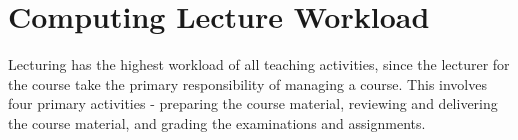


\section{Computing Lecture Workload}

Lecturing has the highest workload of all teaching activities, since the lecturer for the course take the primary responsibility of managing a course. This involves four primary activities - preparing the course material, reviewing and delivering the course material, and grading the examinations and assignments.

